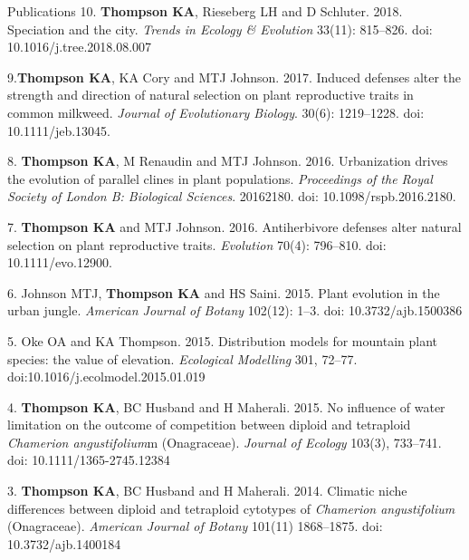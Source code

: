 \documentclass[11pt]{article}
\begin{document}
\begin{rSection}{Publications}
\noindent\hspace{.1cm}10. \textbf{Thompson KA}, Rieseberg LH and D Schluter. 2018. Speciation and the city. \textit{Trends in Ecology \& Evolution} 33(11): 815–826. doi: 10.1016/j.tree.2018.08.007

\noindent\hspace{.1cm}9.\quad \textbf{Thompson KA}, KA Cory and MTJ Johnson. 2017. Induced defenses alter the strength and direction of natural selection on plant reproductive traits in common milkweed. \textit{Journal of Evolutionary Biology}. 30(6): 1219–1228. doi: 10.1111/jeb.13045.

\noindent\hspace{.1cm}8. \textbf{Thompson KA}, M Renaudin and MTJ Johnson. 2016. Urbanization drives the evolution of parallel clines in plant populations. \textit{Proceedings of the Royal Society of London B: Biological Sciences}. 20162180. doi: 10.1098/rspb.2016.2180.

\noindent\hspace{.1cm}7. \textbf{Thompson KA} and MTJ Johnson. 2016. Antiherbivore defenses alter natural selection on plant reproductive traits. \textit{Evolution} 70(4): 796–810. doi: 10.1111/evo.12900.

\noindent\hspace{.1cm}6. Johnson MTJ, \textbf{Thompson KA} and HS Saini. 2015. Plant evolution in the urban jungle. \textit{American Journal of Botany} 102(12): 1–3. doi: 10.3732/ajb.1500386

\noindent\hspace{.1cm}5. Oke OA and KA Thompson. 2015. Distribution models for mountain plant species: the value of elevation. \textit{Ecological Modelling} 301, 72–77. doi:10.1016/j.ecolmodel.2015.01.019

\noindent\hspace{.1cm}4. \textbf{Thompson KA}, BC Husband and H Maherali. 2015. No influence of water limitation on the outcome of competition between diploid and tetraploid \textit{Chamerion angustifolium}m (Onagraceae). \textit{Journal of Ecology} 103(3), 733–741. doi: 10.1111/1365-2745.12384

\noindent\hspace{.1cm}3. \textbf{Thompson KA}, BC Husband and H Maherali. 2014. Climatic niche differences between diploid and tetraploid cytotypes of \textit{Chamerion angustifolium} (Onagraceae). \textit{American Journal of Botany} 101(11) 1868–1875. doi: 10.3732/ajb.1400184 


\end{rSection}
\end{document}
